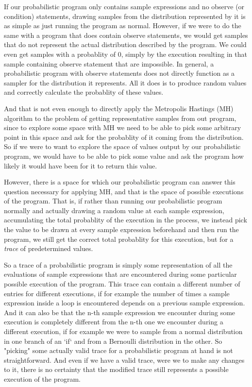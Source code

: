 If our probabilistic program only contains sample expressions and no observe (or condition) statements, drawing samples from the distribution represented by it is as simple as just running the program as normal. However, if we were to do the same with a program that does contain observe statements, we would get samples that do not represent the actual distribution described by the program. We could even get samples with a probablity of $0$, simply by the execution resulting in that sample containing observe statement that are impossible. In general, a probabilistic program with observe statements does not directly function as a sampler for the distribution it represents. All it does is to produce random values and correctly calculate the probablity of these values.

And that is not even enough to directly apply the Metropolis Hastings (MH) algorithm to the problem of getting representative samples from out program, since to explore some space with MH we need to be able to pick some arbitrary point in this space and ask for the probablity of it coming from the distribution. So if we were to want to explore the space of values output by our probabilistic program, we would have to be able to pick some value and ask the program how likely it would have been for it to return this value.

However, there is a space for which our probabilistic program can answer this question necessary for applying MH, and that is the space of possible executions of the program. That is, if rather than running our probabilistic program normally and actually drawing a random value at each sample expression, accumulating the total probablity of the execution in the process, we instead pick the value to be drawn at every sample expression beforehand and then run the program, we still get the correct total probablity for this execution, but for a \textit{trace} of predetermined values.

So a trace of a probabilistic program is simply some representation of all the evaluations of sample expressions that are encountered during some particular possible execution of the program. This trace can contain a different number of entries for different executions, if for example the number of times a sample expression inside a loop is encountered depends on a previous sample expression. And it can also be that the n-th sample expression we encounter during some execution is completely different from the n-th one we encounter during a different execution, if for example we were to sample from a normal distribution in one branch of an `if` and from a Bernoulli distribution in the other. So "picking" some actually valid trace for a probabilistic program at hand is not straightforward. And even if we have a valid trace, were we to make any changes to it, there is no certainty that the modified trace still represents a possible execution of the program.


